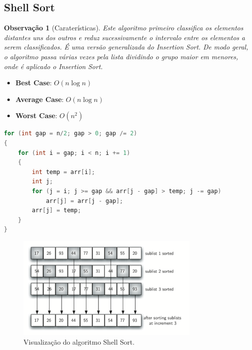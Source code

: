 \documentclass[a4paper, 12pt]{article}
\newtheorem{remark}{Observação}
\begin{document}
\subsection{Shell Sort}
\begin{remark}[Caraterísticas]
    Este algoritmo primeiro classifica os elementos distantes uns dos outros e reduz sucessivamente o intervalo entre os elementos a serem classificados. É uma versão generalizada do Insertion Sort. De modo geral, o algoritmo passa várias vezes pela lista dividindo o grupo maior em menores, onde é aplicado o Insertion Sort.\end{remark}
    \begin{itemize}
        \item \textbf{Best Case}: $O(n\log n)$
        \item \textbf{Average Case}: $O(n\log n)$
        \item \textbf{Worst Case}: $O(n^2)$
    \end{itemize}


\begin{center}
    \begin{lstlisting}[frame=single, language=c, caption=Algoritmo Shell Sort, captionpos=b]
for (int gap = n/2; gap > 0; gap /= 2)
{
    for (int i = gap; i < n; i += 1)
    {
        int temp = arr[i];
        int j;            
        for (j = i; j >= gap && arr[j - gap] > temp; j -= gap)
            arr[j] = arr[j - gap];
        arr[j] = temp;
    }
}
    \end{lstlisting}
    
    \begin{figure}[H]
        \centering
        \includegraphics[width=0.8\textwidth]{fig/ao/shs.png}
        \caption{Visualização do algoritmo Shell Sort.}
    \end{figure}
\end{center}
\end{document}
